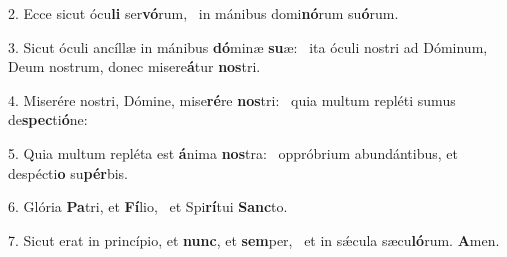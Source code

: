 2. Ecce sicut ócu\textbf{li} ser\textbf{vó}rum, \ast\  in mánibus domi\textbf{nó}rum su\textbf{ó}rum.\

3. Sicut óculi ancíllæ in mánibus \textbf{dó}minæ \textbf{su}æ: \ast\  ita óculi nostri ad Dóminum, Deum nostrum, donec misere\textbf{á}tur \textbf{nos}tri.\

4. Miserére nostri, Dómine, mise\textbf{ré}re \textbf{nos}tri: \ast\  quia multum repléti sumus de\textbf{spec}ti\textbf{ó}ne:\

5. Quia multum repléta est \textbf{á}nima \textbf{nos}tra: \ast\  oppróbrium abundántibus, et despécti\textbf{o} su\textbf{pér}bis.\

6. Glória \textbf{Pa}tri, et \textbf{Fí}lio, \ast\  et Spi\textbf{rí}tui \textbf{Sanc}to.\

7. Sicut erat in princípio, et \textbf{nunc}, et \textbf{sem}per, \ast\  et in sǽcula sæcu\textbf{ló}rum. \textbf{A}men.\

